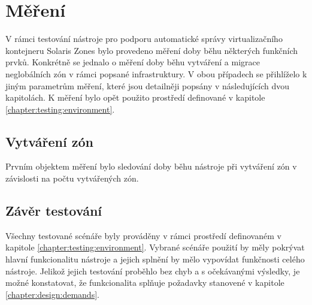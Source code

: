 \section{Měření}
\label{chapter:measurement}
V rámci testování nástroje pro podporu automatické správy virtualizačního kontejneru Solaris Zones bylo provedeno měření doby
běhu některých funkčních prvků. Konkrétně se jednalo o měření doby běhu vytváření a migrace neglobálních zón v rámci popsané
infrastruktury. V obou případech se přihlíželo k jiným parametrům měření, které jsou detailněji popsány v následujících dvou
kapitolách. K měření bylo opět použito prostředí definované v kapitole \ref{chapter:testing:environment}.
\subsection{Vytváření zón}
\label{chapter:measurement:}
Prvním objektem měření bylo sledování doby běhu nástroje při vytváření zón v závislosti na počtu vytvářených zón.

\subsection{}
\label{chapter:measurement:}

\subsection{Závěr testování}
\label{chapter:testing:scenario:conclusion}
Všechny testované scénáře byly prováděny v rámci prostředí definovaném v kapitole \ref{chapter:testing:environment}. Vybrané 
scénáře použití by měly pokrývat hlavní funkcionalitu nástroje a jejich splnění by mělo vypovídat funkčnosti celého nástroje.
Jelikož jejich testování proběhlo bez chyb a s očekávanými výsledky, je možné konstatovat, že funkcionalita splňuje požadavky
stanovené v kapitole \ref{chapter:design:demands}.